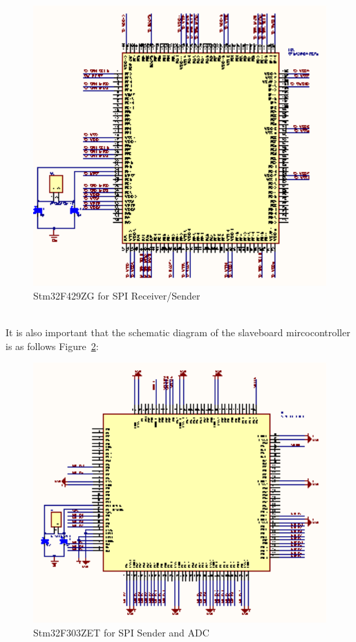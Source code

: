 \begin{figure}[!ht]
	\centering
	\includegraphics[width=16cm]{grafiken/f429conn.eps}
	\caption{Stm32F429ZG for SPI Receiver/Sender} 
	\label{fig:6.4}
\end{figure}
\FloatBarrier
\\
It is also important that the schematic diagram of the slaveboard mircocontroller is as follows Figure~\ref{fig:6.5}:

\begin{figure}[!ht]
	\centering
	\includegraphics[width=16cm]{grafiken/f303.eps}
	\caption{Stm32F303ZET for SPI Sender and ADC} 
	\label{fig:6.5}
\end{figure}
\FloatBarrier
\\

